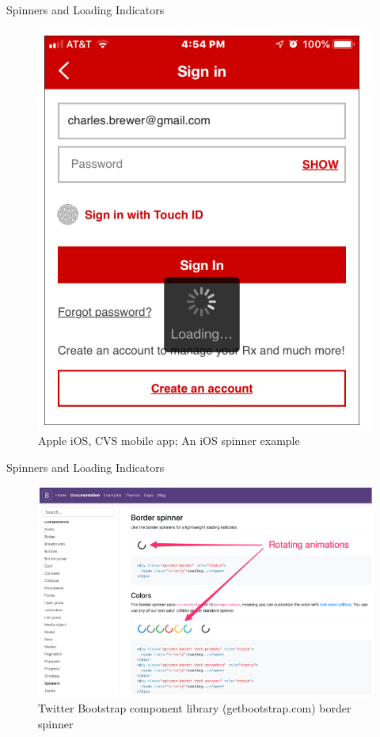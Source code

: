 \documentclass{beamer}
\begin{document}
\begin{frame}[t]{Spinners and Loading Indicators}
	\begin{figure}[h]
		\centering
		\includegraphics[scale=0.6]{images/lec08-pic19.png}
		\caption{Apple iOS, CVS mobile app; An iOS spinner example}
	\end{figure}
\end{frame}

\begin{frame}[t]{Spinners and Loading Indicators}
	\begin{figure}[h]
		\centering
		\includegraphics[scale=0.6]{images/lec08-pic20.png}
		\caption{Twitter Bootstrap component library (getbootstrap.com) border spinner}
	\end{figure}
\end{frame}
\end{document}
